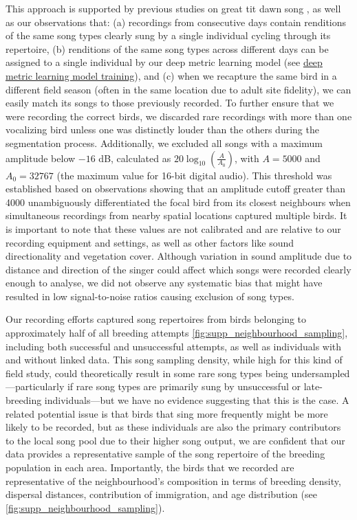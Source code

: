 \documentclass[9pt, onecolumn, twoside, lineno]{gsajnl}
\begin{document}
This approach is supported by previous studies on great tit dawn song \autocite{keen2020, naguib2019,snijders2015, boucaud2016, boucaud2016a}, as well as our observations that: (a) recordings from consecutive days contain renditions of the same song types clearly sung by a single individual cycling through its repertoire, (b) renditions of the same song types across different days can be assigned to a single individual by our deep metric learning model (see \hyperref[sc:song-similarity]{deep metric learning model training}), and (c) when we recapture the same bird in a different field season (often in the same location due to adult site fidelity), we can easily match its songs to those previously recorded. To further ensure that we were recording the correct birds, we discarded rare recordings with more than one vocalizing bird unless one was distinctly louder than the others during the segmentation process. Additionally, we excluded all songs with a maximum amplitude below $-16$ dB, calculated as $20\log_{10}\left(\frac{A}{A_0}\right)$, with $A=5000$ and $A_0=32767$ (the maximum value for 16-bit digital audio). This threshold was established based on observations showing that an amplitude cutoff greater than 4000 unambiguously differentiated the focal bird from its closest neighbours when simultaneous recordings from nearby spatial locations captured multiple birds. It is important to note that these values are not calibrated and are relative to our recording equipment and settings, as well as other factors like sound directionality and vegetation cover. Although variation in sound amplitude due to distance and direction of the singer could affect which songs were recorded clearly enough to analyse, we did not observe any systematic bias that might have resulted in low signal-to-noise ratios causing exclusion of song types.

Our recording efforts captured song repertoires from birds belonging to approximately half of all breeding attempts \autoref{fig:supp_neighbourhood_sampling}, including both successful and unsuccessful attempts, as well as individuals with and without linked data. This song sampling density, while high for this kind of field study, could theoretically result in some rare song types being undersampled---particularly if rare song types are primarily sung by unsuccessful or late-breeding individuals---but we have no evidence suggesting that this is the case. A related potential issue is that birds that sing more frequently might be more likely to be recorded, but as these individuals are also the primary contributors to the local song pool due to their higher song output, we are confident that our data provides a representative sample of the song repertoire of the breeding population in each area. Importantly, the birds that we recorded are representative of the neighbourhood's composition in terms of breeding density, dispersal distances, contribution of immigration, and age distribution (see  \autoref{fig:supp_neighbourhood_sampling}).
 
\end{document}
